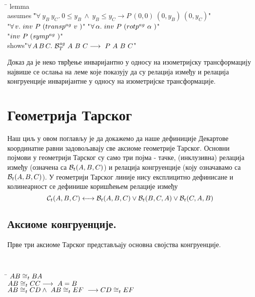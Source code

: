 {\tt
\begin{tabbing}
\hspace{5mm}\=\kill
lemma\\
\>assumes \="$\forall\ y_B\ y_C.\ 0 \le y_B \ \wedge\  y_B \le y_C \longrightarrow P\ (0, 0)\ (0, y_B)\ (0, y_C)$"\\
\>\>       "$\forall\,v.\ inv\ P\ (\agtransp{v}{})$" "$\forall\,\alpha.\ inv\ P\ (\agrotp{\alpha}{})$"\\
\>\>       "$inv\ P\ (symp^{ag}\ )$"\\
\>shows\>"$\forall\,A\,B\,C.\ \mathcal{B}_T^{\mathit{ag}}\ A\ B\ C \longrightarrow\ P\
A\ B\ C$"
\end{tabbing}
}

Доказ да је неко тврђење инваријантно у односу на изометријску
трансформацију највише се ослања на леме које показују да су релација
између и релација конгруенције инваријантне у односу на изометријске
трансформације.

\section{Геометрија Тарског}
\label{sec:tarski}

Наш циљ у овом поглављу је да докажемо да наше дефиниције Декартове
координатне равни задовољавају све аксиоме геометрије
Тарског\cite{tarski}.  Основни појмови у геометрији Тарског су само
три појма - тачке, (инклузивна) релација између (означена са
$\mathcal{B}_t(A, B, C)$) и релација конгруенције (коју означавамо са
$\mathcal{B}_t(A, B, C)$). У геометрији Тарског линије нису експлицитно
дефинисане и колинеарност се дефинише коришћењем релације између
$$\mathcal{C}_t(A, B, C) \longleftrightarrow \mathcal{B}_t(A, B, C) \vee \mathcal{B}_t(B, C, A) \vee \mathcal{B}_t(C, A, B)$$

\subsection{Аксиоме конгруенције.}

Прве три аксиоме Тарског представљају основна својства конгруенције.
{\tt
\begin{tabbing}
\hspace{5mm}\=\kill
$AB \cong_t BA$\\
$AB \cong_t CC \longrightarrow\ A = B$\\
$\congrt{A}{B}{C}{D} \wedge\ \congrt{A}{B}{E}{F}\ \longrightarrow \congrt{C}{D}{E}{F}$
\end{tabbing}
}
\vspace{-2mm}

